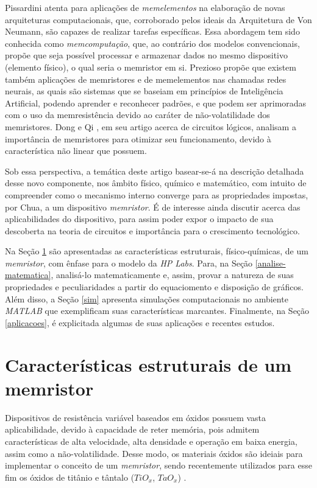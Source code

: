 \documentclass{ceel}
\begin{document}
\begin{multicols}{2}
Pissardini \cite{memcomputacao} atenta para aplicações de \emph{memelementos} na elaboração de novas arquiteturas computacionais, que, corroborado pelos ideais da Arquitetura de Von Neumann, são capazes de realizar tarefas específicas. Essa abordagem tem sido conhecida como \emph{memcomputação}, que, ao contrário dos modelos convencionais, propõe que seja possível processar e armazenar dados no mesmo dispositivo (elemento físico), o qual seria o memristor em si. Prezioso \cite{rneurais} propõe que existem também aplicações de memristores e de memelementos nas chamadas redes neurais, as quais são sistemas que se baseiam em princípios de Inteligência Artificial, podendo aprender e reconhecer padrões, e que podem ser aprimoradas com o uso da memresistência devido ao caráter de não-volatilidade dos memristores. Dong e Qi \cite{chines}, em seu artigo acerca de circuitos lógicos, analisam a importância de memristores para otimizar
seu funcionamento, devido à característica não linear que possuem.

Sob essa perspectiva, a temática deste artigo basear-se-á na descrição detalhada desse novo componente, nos âmbito físico, químico e matemático, com intuito de compreender como o mecanismo interno converge para as propriedades impostas,  por Chua, a um dispositivo \emph{memristor}. É de interesse ainda discutir acerca das aplicabilidades do dispositivo, para assim poder expor o impacto de sua descoberta na teoria de circuitos e importância para o crescimento tecnológico. %

Na Seção \ref{estrutura} são apresentadas as características estruturais, físico-químicas, de um \emph{memristor}, com ênfase para o modelo da \emph{HP Labs}. Para, na Seção \ref{analise-matematica}, analisá-lo matematicamente e, assim, provar a natureza de suas propriedades e peculiaridades a partir do equaciomento e disposição de gráficos. Além disso, a Seção \ref{sim} apresenta simulações computacionais no ambiente \emph{MATLAB}
que exemplificam suas características marcantes. Finalmente, na Seção \ref{aplicacoes}, é explicitada algumas de suas aplicações e recentes estudos.


\section{Características estruturais de um memristor} \label{estrutura}
Dispositivos de resistência variável baseados em óxidos 
possuem vasta aplicabilidade, devido à capacidade de reter memória, pois
admitem características de alta velocidade, alta densidade e operação em baixa energia, 
assim como a não-volatilidade. Desse modo, os materiais óxidos são ideiais para implementar o conceito de um \emph{memristor}, sendo recentemente utilizados para esse fim os óxidos de titânio e tântalo ($TiO_x$, $TaO_x$) \cite{conceito}. %


\end{multicols}
\end{document}
